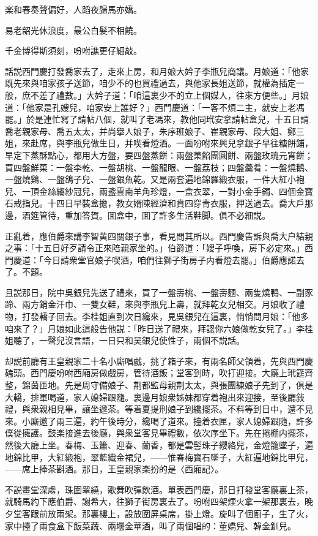 楽和春奏聲偏好，人蹈夜歸馬亦嬌。

易老韶光休浪度，最公白髮不相饒。

千金博得斯須刻，吩咐譙更仔細敲。

話説西門慶打發喬家去了，走來上房，和月娘大妗子李瓶兒商議。月娘道：「他家既先來與咱家孩子送節，咱少不的也買禮過去，與他家長姐送節，就權為插定一般，庶不差了禮數。」大妗子道：「咱這裏少不的立上個媒人，往來方便些。」月娘道：「他家是孔嫂兒，咱家安上誰好？」西門慶道：「一客不煩二主，就安上老馮罷。」於是連忙冩了請帖八個，就叫了老馮來，教他同玳安拿請帖盒兒，十五日請喬老親家母、喬五太太，并尚擧人娘子，朱序班娘子、崔親家母、段大姐、鄭三姐，來赴席，與李瓶兒做生日，并喫看燈酒。一面吩咐來興兒拿銀子早往糖餅鋪，早定下蒸酥點心，都用大方盤，要四盤蒸餅：兩盤菓餡團圓餅、兩盤玫瑰元宵餅；買四盤鮮菓：一盤李乾、一盤胡桃、一盤龍眼、一盤荔枝；四盤羹肴：一盤燒鵝、一盤燒鷄、一盤鴿子兒、一盤銀魚乾。又是兩套遍地錦羅緞衣服，一件大紅小袍兒、一頂金絲縐紗冠兒，兩盞雲南羊角珍燈，一盒衣翠，一對小金手鐲、四個金寳石戒指兒。十四日早裝盒擔，教女婿陳經濟和賁四穿青衣服，押送過去。喬大戶那邊，酒筵管待，重加答賀。囬盒中，囬了許多生活鞋脚。俱不必細説。

正亂着，應伯爵來講李智黄四關銀子事，看見問其所以。西門慶告訴與喬大户結親之事：「十五日好歹請令正來陪親家坐的。」伯爵道：「嫂子呼喚，房下必定來。」西門慶道：「今日請衆堂官娘子喫酒，咱們往獅子街房子内看燈去罷。」伯爵應諾去了。不題。

且説那日，院中吳銀兒先送了禮來，買了一盤壽桃、一盤壽麵、兩隻燒鴨、一副豕蹄、兩方銷金汗巾、一雙女鞋，來與李瓶兒上壽，就拜乾女兒相交。月娘收了禮物，打發轎子回去。李桂姐直到次日纔來，見吳銀兒在這裏，悄悄問月娘：「他多咱來了？」月娘如此這般告他説：「昨日送了禮來，拜認你六娘做乾女兒了。」李桂姐聽了，一聲兒沒言語，一日只和吴銀兒使性子，兩個不説話。

却説前廳有王皇親家二十名小廝唱戲，挑了箱子來，有兩名師父領着，先與西門慶磕頭。西門慶吩咐西廂房做戲房，管待酒飯；堂客到時，吹打迎接。大廳上玳筵齊整，錦茵匝地。先是周守備娘子、荆都監母親荆太太，與張團練娘子先到了，俱是大轎，排軍喝道，家人媳婦跟隨。裏邊月娘衆姊妹都穿着袍出來迎接，至後廳敍禮，與衆親相見畢，讓坐遞茶。等着夏提刑娘子到纔擺茶。不料等到日中，還不見來。小廝邀了兩三遍，約午後時分，纔喝了道來。擡着衣匣，家人媳婦跟隨，許多僕從擁護。鼓楽接進去後廳，與衆堂客見畢禮數，依次序坐下。先在捲棚内擺茶，然後大廳上坐。春梅、玉簫、迎春、蘭香，都是雲髻珠子纓絡兒，金燈籠墜子，遍地錦比甲，大紅緞袍，翠藍織金裙兒，——惟春梅寳石墜子，大紅遍地錦比甲兒，——席上捧茶斟酒。那日，王皇親家楽扮的是〈西廂記〉。

不説畫堂深䖏，珠圍翠繞，歌舞吹彈飲酒。單表西門慶，那日打發堂客廳裏上茶，就騎馬約下應伯爵、謝希大，往獅子街房裏去了。吩咐四架煙火拿一架那裏去，晚夕堂客跟前放兩架。那裏樓上，設放圍屏桌席，掛上燈。旋叫了個廚子，生了火，家中擡了兩食盒下飯菜蔬、兩壜金華酒，叫了兩個唱的：董嬌兒、韓金釧兒。


